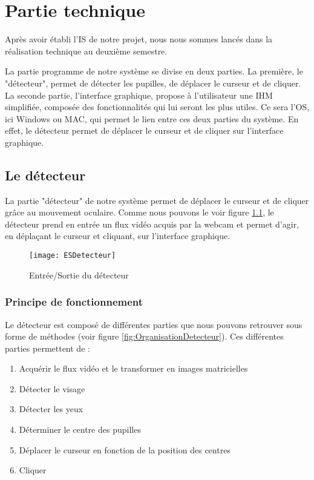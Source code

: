 \chapter{Partie technique}

Après avoir établi l'IS de notre projet, nous nous sommes lancés dans la réalisation technique au deuxième semestre.

La partie programme de notre système se divise en deux parties. La première, le "détecteur", permet de détecter les pupilles, de déplacer le curseur et de cliquer. La seconde partie, l’interface graphique, propose à l’utilisateur une IHM simplifiée, composée des fonctionnalités qui lui seront les plus utiles. Ce sera l’OS, ici Windows ou MAC, qui permet le lien entre ces deux parties du système. En effet, le détecteur permet de déplacer le curseur et de cliquer sur l’interface graphique.

\section{Le détecteur}

La partie "détecteur" de notre système permet de déplacer le curseur et de cliquer grâce au mouvement oculaire. Comme nous pouvons le voir figure \ref{fig:ESDetecteur}, le détecteur prend en entrée un flux vidéo acquis par la webcam et permet d’agir, en déplaçant le curseur et cliquant, sur l’interface graphique. 

\begin{figure}[H]
  \centering
  \texttt{[image: ESDetecteur]}
  \caption{Entrée/Sortie du détecteur}
  \label{fig:ESDetecteur}
\end{figure}

\subsection{Principe de fonctionnement}

Le détecteur est composé de différentes parties que nous pouvons retrouver sous forme de méthodes (voir figure \ref{fig:OrganisationDetecteur}). Ces différentes parties permettent de :

\begin{enumerate}
\item Acquérir le flux vidéo et le transformer en images matricielles
\item Détecter le visage
\item Détecter les yeux
\item Déterminer le centre des pupilles
\item Déplacer le curseur en fonction de la position des centres
\item Cliquer
\end{enumerate}

